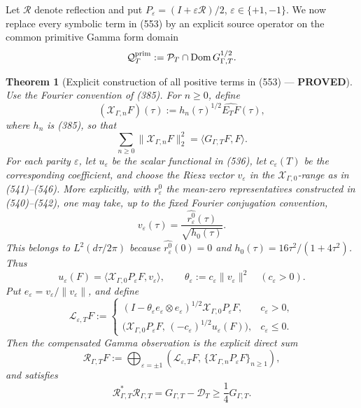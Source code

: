 \documentclass[11pt]{article}
\newtheorem{theorem}{Theorem}
\newcommand{\PROVED}{\textcolor{green!45!black}{\textbf{PROVED}}}
\begin{document}
Let \(\mathcal R\) denote reflection and put
\(P_\varepsilon=(I+\varepsilon\mathcal R)/2\),
\(\varepsilon\in\{+1,-1\}\).  We now replace every symbolic term in (553)
by an explicit source operator on the common primitive Gamma form domain
\[
 \mathcal Q_T^{\rm prim}:=
 \mathcal P_T\cap\operatorname{Dom}G_{\Gamma,T}^{1/2}.
\]

\begin{theorem}[Explicit construction of all positive terms in (553) ---
\PROVED]
Use the Fourier convention of (385).  For \(n\ge0\), define
\begin{equation}
 (\mathcal X_{\Gamma,n}F)(\tau)
 :=h_n(\tau)^{1/2}\widehat{E_TF}(\tau),              \tag{571}
\end{equation}
where \(h_n\) is (385), so that
\[
 \sum_{n\ge0}\|\mathcal X_{\Gamma,n}F\|_2^2
 =\langle G_{\Gamma,T}F,F\rangle .
\]
For each parity \(\varepsilon\), let \(u_\varepsilon\) be the scalar
functional in (536), let \(c_\varepsilon(T)\) be the corresponding
coefficient, and choose the Riesz vector \(v_\varepsilon\) in the
\(\mathcal X_{\Gamma,0}\)-range as in (541)--(546).  More explicitly, with
\(r_\varepsilon^0\) the mean-zero representatives constructed in
(540)--(542), one may take, up to the fixed Fourier conjugation convention,
\[
 v_\varepsilon(\tau)=
 \frac{\widehat{r_\varepsilon^0}(\tau)}{\sqrt{h_0(\tau)}}.
\]
This belongs to \(L^2(d\tau/2\pi)\) because
\(\widehat{r_\varepsilon^0}(0)=0\) and
\(h_0(\tau)=16\tau^2/(1+4\tau^2)\).  Thus
\begin{equation}
 u_\varepsilon(F)
 =\langle\mathcal X_{\Gamma,0}P_\varepsilon F,
                 v_\varepsilon\rangle,\qquad
 \theta_\varepsilon
 :=c_\varepsilon\|v_\varepsilon\|^2
 \quad(c_\varepsilon>0).                             \tag{572}
\end{equation}
Put \(e_\varepsilon=v_\varepsilon/\|v_\varepsilon\|\), and define
\[
 \mathcal L_{\varepsilon,T}F:=
 \begin{cases}
 (I-\theta_\varepsilon e_\varepsilon\otimes
 e_\varepsilon)^{1/2}\mathcal X_{\Gamma,0}
 P_\varepsilon F,&c_\varepsilon>0,\\[2mm]
 \bigl(\mathcal X_{\Gamma,0}P_\varepsilon F,\,
       (-c_\varepsilon)^{1/2}u_\varepsilon(F)\bigr),
       &c_\varepsilon\le0.
 \end{cases}                                         \tag{573}
\]
Then the compensated Gamma observation is the explicit direct sum
\begin{equation}
 \boxed{\mathcal R_{\Gamma,T}F:=
 \bigoplus_{\varepsilon=\pm1}
 \left(\mathcal L_{\varepsilon,T}F,\,
       \{\mathcal X_{\Gamma,n}P_\varepsilon F\}_{n\ge1}\right),} \tag{574}
\end{equation}
and satisfies
\begin{equation}
 \mathcal R_{\Gamma,T}^*\mathcal R_{\Gamma,T}
 =G_{\Gamma,T}-\mathcal D_T
 \ge\frac14G_{\Gamma,T}.                             \tag{575}
\end{equation}


\end{theorem}
\end{document}
